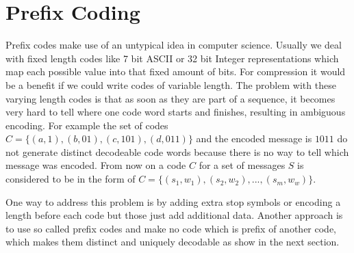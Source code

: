 \section{Prefix Coding}
\label{ch:Principles of compression:sec:Huffman Coding}
\par{
Prefix codes make use of an untypical idea in computer science. Usually we deal with fixed length codes like 7 bit ASCII or 32 bit Integer representations which map each possible value into that fixed amount of bits. For compression it would be a benefit if we could write codes of variable length. The problem with these varying length codes is that as soon as they are part of a sequence, it becomes very hard to tell where one code word starts and finishes, resulting in ambiguous encoding. For example the set of codes $ C= \{(a,1),(b,01),(c,101),(d,011)\}$ and the encoded message is $1011$ do not generate distinct decodeable code words because there is no way to tell which message was encoded. From now on a code $C$ for a set of messages $S$ is considered to be in the form of $ C= \{(s_1,w_1),(s_2,w_2),...,(s_m,w_w)\}$.
}
\par{
One way to address this problem is by adding extra stop symbols or encoding a length before each code but those just add additional data. Another approach is to use so called prefix codes and make no code which is prefix of another code, which makes them distinct and uniquely decodable as show in the next section.
}

